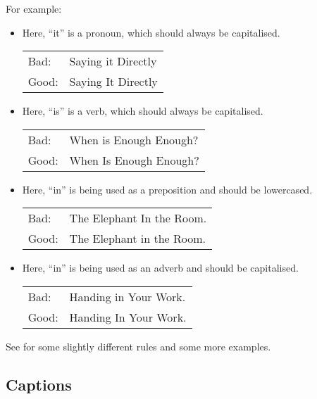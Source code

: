 For example:
\begin{itemize}

\item Here, ``it'' is a pronoun, which should always be capitalised.

\begin{tabular}{lp{0.9\hsize}}
Bad:  & Saying it Directly \\
Good: & Saying It Directly \\
\end{tabular}



\item Here, ``is'' is a verb, which should always be capitalised.

\begin{tabular}{lp{0.9\hsize}}
Bad:  & When is Enough Enough? \\
Good: & When Is Enough Enough? \\
\end{tabular}



\item Here, ``in'' is being used as a preposition and should be 
lowercased.

\begin{tabular}{lp{0.9\hsize}}
Bad:  & The Elephant In the Room. \\
Good: & The Elephant in the Room. \\
\end{tabular}


\item Here, ``in'' is being used as an adverb and should be 
capitalised.

\begin{tabular}{lp{0.9\hsize}}
Bad:  & Handing in Your Work. \\
Good: & Handing In Your Work. \\
\end{tabular}


\end{itemize}

See \citet{WB-Capitalisation} for some slightly different rules and
some more examples.






\subsection{Captions}

